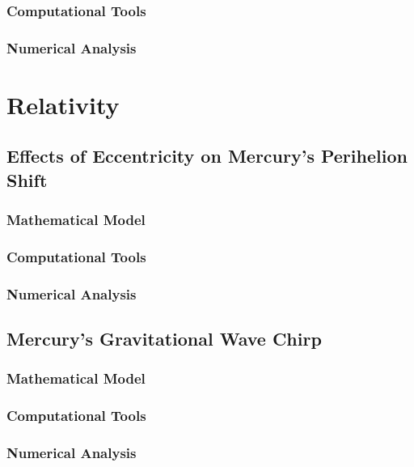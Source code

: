 \documentclass{report}
\begin{document}
        \subsection{Computational Tools}

        \subsection{Numerical Analysis}

\chapter{Relativity} \label{sec:relativity}

    \section{Effects of Eccentricity on Mercury's Perihelion Shift}

        \subsection{Mathematical Model}

        \subsection{Computational Tools}

        \subsection{Numerical Analysis}

    \section{Mercury's Gravitational Wave Chirp}

        \subsection{Mathematical Model}

        \subsection{Computational Tools}

        \subsection{Numerical Analysis}
\end{document}
